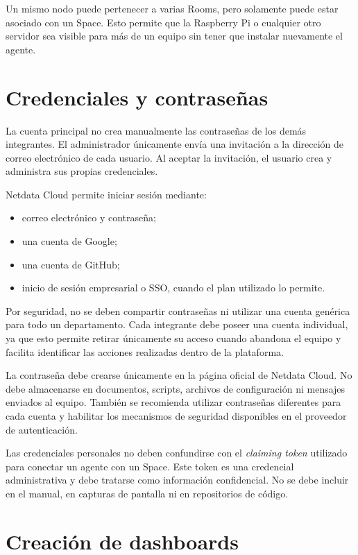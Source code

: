 Un mismo nodo puede pertenecer a varias Rooms, pero solamente puede estar asociado con
un Space. Esto permite que la Raspberry Pi o cualquier otro servidor sea visible para
más de un equipo sin tener que instalar nuevamente el agente.

\section{Credenciales y contraseñas}

La cuenta principal no crea manualmente las contraseñas de los demás integrantes. El
administrador únicamente envía una invitación a la dirección de correo electrónico de
cada usuario. Al aceptar la invitación, el usuario crea y administra sus propias
credenciales.

Netdata Cloud permite iniciar sesión mediante:

\begin{itemize}
    \item correo electrónico y contraseña;
    \item una cuenta de Google;
    \item una cuenta de GitHub;
    \item inicio de sesión empresarial o SSO, cuando el plan utilizado lo permite.
\end{itemize}

Por seguridad, no se deben compartir contraseñas ni utilizar una cuenta genérica para
todo un departamento. Cada integrante debe poseer una cuenta individual, ya que esto
permite retirar únicamente su acceso cuando abandona el equipo y facilita identificar
las acciones realizadas dentro de la plataforma.

La contraseña debe crearse únicamente en la página oficial de Netdata Cloud. No debe
almacenarse en documentos, scripts, archivos de configuración ni mensajes enviados al
equipo. También se recomienda utilizar contraseñas diferentes para cada cuenta y
habilitar los mecanismos de seguridad disponibles en el proveedor de autenticación.

Las credenciales personales no deben confundirse con el \textit{claiming token} utilizado
para conectar un agente con un Space. Este token es una credencial administrativa y
debe tratarse como información confidencial. No se debe incluir en el manual, en
capturas de pantalla ni en repositorios de código.

\section{Creación de dashboards}

